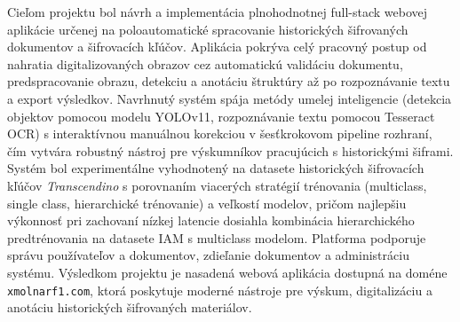Cieľom projektu bol návrh a implementácia plnohodnotnej full-stack webovej aplikácie určenej na poloautomatické spracovanie historických šifrovaných dokumentov a šifrovacích kľúčov. Aplikácia pokrýva celý pracovný postup od nahratia digitalizovaných obrazov cez automatickú validáciu dokumentu, predspracovanie obrazu, detekciu a anotáciu štruktúry až po rozpoznávanie textu a export výsledkov. Navrhnutý systém spája metódy umelej inteligencie (detekcia objektov pomocou modelu YOLOv11, rozpoznávanie textu pomocou Tesseract OCR) s interaktívnou manuálnou korekciou v šesťkrokovom pipeline rozhraní, čím vytvára robustný nástroj pre výskumníkov pracujúcich s historickými šiframi. Systém bol experimentálne vyhodnotený na datasete historických šifrovacích kľúčov \textit{Transcendino} s porovnaním viacerých stratégií trénovania (multiclass, single class, hierarchické trénovanie) a veľkostí modelov, pričom najlepšiu výkonnosť pri zachovaní nízkej latencie dosiahla kombinácia hierarchického predtrénovania na datasete IAM s multiclass modelom. Platforma podporuje správu používateľov a dokumentov, zdieľanie dokumentov a administráciu systému. Výsledkom projektu je nasadená webová aplikácia dostupná na doméne \texttt{xmolnarf1.com}, ktorá poskytuje moderné nástroje pre výskum, digitalizáciu a anotáciu historických šifrovaných materiálov.
